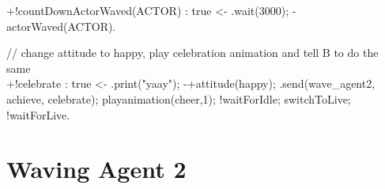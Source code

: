 \documentclass[draft,final]{vutinfth} %
\begin{document}
{+!countDownActorWaved(ACTOR) : true
                    <-  .wait(3000);
                        -actorWaved(ACTOR).

// change attitude to happy, play celebration animation and tell B to do the same\\
+!celebrate : true
                    <-  .print("yaay");
                        -+attitude(happy);
                        .send(wave\_agent2, achieve, celebrate);
                        playanimation(cheer,1);
                        !waitForIdle;
                        switchToLive;
                        !waitForLive.
                        
}

\normalsize
\section{Waving Agent 2}
\end{document}
